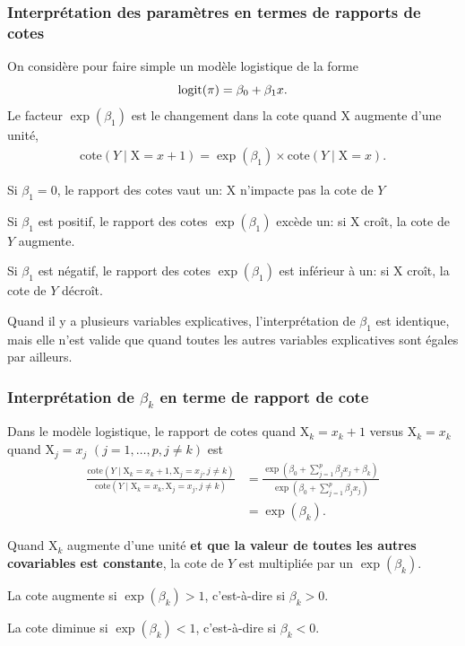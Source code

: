 \documentclass{beamer}
\begin{document}
\begin{frame}[fragile]
\frametitle{Interprétation des paramètres en termes de rapports de cotes}
On considère pour faire simple un modèle logistique de la forme
\[\operatorname{logit}(\pi) = \beta_0 + \beta_1x.\]
Le facteur $\exp(\beta_1)$ est le changement dans la cote quand $\mathrm{X}$ augmente d'une unité,
\begin{align*}
\mathrm{cote}(Y \mid  \mathrm{X}=x+1) = \exp(\beta_1) \times \mathrm{cote}(Y \mid  \mathrm{X}=x).
\end{align*}
\bi
\item Si $\beta_1=0$, le rapport des cotes vaut un: $\mathrm{X}$ n'impacte pas la cote de $Y$
\item Si $\beta_1$ est positif, le rapport des cotes $\exp(\beta_1)$ excède un: si $\mathrm{X}$ croît, la cote de $Y$ augmente.
\item Si $\beta_1$ est négatif, le rapport des cotes $\exp(\beta_1)$ est inférieur à un: si $\mathrm{X}$ croît, la cote de  $Y$ décroît.

\ei 

\footnotesize{Quand il y a plusieurs variables explicatives, l'interprétation de $\beta_1$ est identique, mais elle n'est valide que quand \alert{toutes les autres variables explicatives sont égales par ailleurs.}

}

\end{frame}
\begin{frame}[fragile]
\frametitle{Interprétation de $\beta_k$ en terme de rapport de cote}

Dans le modèle logistique,  le \alert{rapport de cotes} quand $\mathrm{X}_k=x_k+1$ versus $\mathrm{X}_k=x_k$ quand $\mathrm{X}_j=x_j$ $(j=1, \ldots, p, j \neq k)$ est
{\small
\begin{align*}
\frac{\mathrm{cote}(Y \mid  \mathrm{X}_k=x_k+1, \mathrm{X}_j=x_j, j\neq k)}{\mathrm{cote}(Y \mid \mathrm{X}_k=x_k, \mathrm{X}_j=x_j, j \neq k)}&=\frac{\exp\left(\beta_0+ \sum_{j=1}^p\beta_j x_j + \beta_k \right)}{\exp\left(\beta_0+ \sum_{j=1}^p\beta_j x_j \right)}\\
&= \exp(\beta_k).
\end{align*}
}

Quand $\mathrm{X}_k$ augmente d'une unité \textbf{et que la valeur de toutes les autres covariables est constante}, la cote de $Y$ est multipliée par un $\exp(\beta_k)$.
\bi 
\item La cote augmente si $\exp(\beta_k) >1$, c'est-à-dire si $\beta_k>0$.
\item La cote diminue si $\exp(\beta_k) < 1$,  c'est-à-dire si $\beta_k<0$.
\ei
\end{frame}
\end{document}
